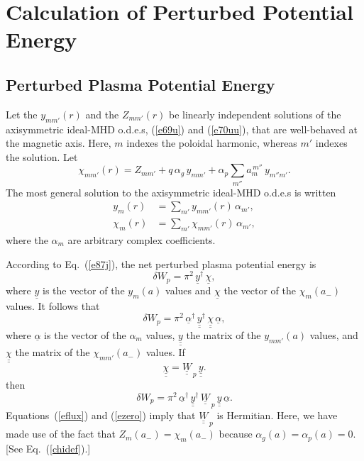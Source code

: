 \documentclass[12pt,prb,aps,notitlepage]{revtex4-1}
\begin{document}
\section{Calculation of Perturbed Potential Energy}
\subsection{Perturbed Plasma Potential Energy}
Let  the $y_{mm'}(r)$ and the $Z_{mm'}(r)$ be linearly independent solutions of the axisymmetric ideal-MHD o.d.e.s, (\ref{e69u}) and
(\ref{e70uu}), that are well-behaved at the magnetic axis. Here, $m$ indexes the poloidal harmonic, whereas $m'$ indexes the solution. 
Let 
\begin{equation}
\chi_{mm'}(r)=Z_{mm'} + q\,\alpha_g\,y_{mm'} + \alpha_p\sum_{m''} a_m^{\,m''}\,y_{m''m'}.
\end{equation}
The most general solution to the axisymmetric ideal-MHD o.d.e.s is written
\begin{align}
y_m(r) &= \sum_{m'} y_{mm'}(r)\,\alpha_{m'},\\[0.5ex]
\chi_m(r)&= \sum_{m'} \chi_{mm'}(r)\,\alpha_{m'},
\end{align}
where the $\alpha_m$ are arbitrary complex coefficients. 

According to Eq.~(\ref{e87j}), the net perturbed plasma potential energy is
\begin{equation}
\delta W_p = \pi^2\,\underline{y}^{\dag}\,\underline{\chi},
\end{equation}
where $\underline{y}$ is the vector of the $y_m(a)$ values and $\underline{\chi}$  the vector of the $\chi_m(a_-)$ values. It follows that
\begin{equation}
\delta W_p = \pi^2\,\underline{\alpha}^\dag \,\underline{\underline{y}}^\dag \,\underline{\underline{\chi}}\,\underline{\alpha},
\end{equation}
where $\underline{\alpha}$ is the vector of the $\alpha_m$ values, $\underline{\underline{y}}$ the matrix of the $y_{mm'}(a)$ values,
and $\underline{\underline{\chi}}$ the matrix of the $\chi_{mm'}(a_-)$ values. 
If
\begin{equation}
\underline{\underline{\chi}} = \underline{\underline{W}}_{\,p}\,\underline{\underline{y}}.
\end{equation}
then 
\begin{equation}
\delta W_p = \pi^2\,\underline{\alpha}^\dag \,\underline{\underline{y}}^\dag \,\underline{\underline{W}}_{\,p}\,\underline{\underline{y}}\,\underline{\alpha}.
\end{equation}
Equations~(\ref{eflux}) and (\ref{ezero}) imply that $\underline{\underline{W}}_{\,p}$ is Hermitian. Here, we have made use of the fact that
$Z_m(a_-)= \chi_m(a_-)$ because $\alpha_g(a)=\alpha_p(a)=0$. [See Eq.~(\ref{chidef}).]
\end{document}
